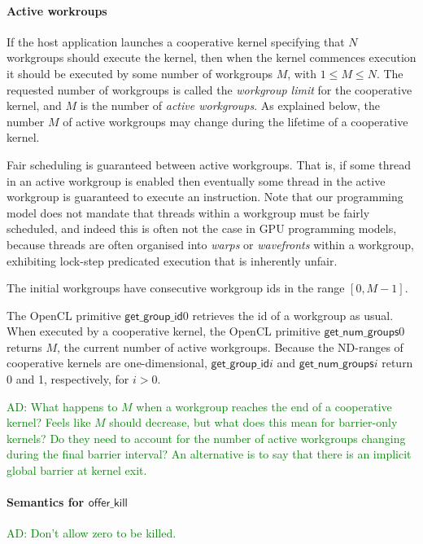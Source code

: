 \documentclass[nocopyrightspace]{sigplanconf-pldi16}
\newcommand{\ADComment}[1]{\textcolor{green}{AD: #1}}
\newcommand{\offerkill}{\mathsf{offer\_kill}}
\newcommand{\getgroupid}{\mathsf{get\_group\_id}}
\newcommand{\getnumgroups}{\mathsf{get\_num\_groups}}
\begin{document}
\paragraph{Active workroups}

If the host application launches a cooperative kernel specifying that
$N$ workgroups should execute the kernel, then when the kernel
commences execution it should be executed by some number of workgroups
$M$, with $1\leq M \leq N$.  The requested number of workgroups is
called the \emph{workgroup limit} for the cooperative kernel, and $M$
is the number of \emph{active workgroups}.  As explained below, the
number $M$ of active workgroups may change during the lifetime of a
cooperative kernel.

Fair scheduling is guaranteed between active workgroups.  That is, if
some thread in an active workgroup is enabled then eventually some
thread in the active workgroup is guaranteed to execute an
instruction.  Note that our programming model does not mandate that
threads within a workgroup must be fairly scheduled, and indeed this
is often not the case in GPU programming models, because threads are
often organised into \emph{warps} or \emph{wavefronts} within a
workgroup, exhibiting lock-step predicated execution that is
inherently unfair.

The initial workgroups have consecutive workgroup ids in the range
$[0, M-1]$.

The OpenCL primitive $\getgroupid{0}$ retrieves the id of a
workgroup as usual.  When executed by a cooperative kernel, the OpenCL
primitive $\getnumgroups{0}$ returns $M$, the current number
of active workgroups.  Because the ND-ranges of cooperative kernels
are one-dimensional, $\getgroupid{\mathit{i}}$ and
$\getnumgroups{\mathit{i}}$ return 0 and 1, respectively, for $i >
0$.

\ADComment{What happens to $M$ when a workgroup reaches the end of a
  cooperative kernel?  Feels like $M$ should decrease, but what does
  this mean for barrier-only kernels?  Do they need to account for the
  number of active workgroups changing during the final barrier
  interval?  An alternative is to say that there is an implicit global barrier at kernel exit.}

\paragraph{Semantics for $\offerkill$}

\ADComment{Don't allow zero to be killed.}
\end{document}
